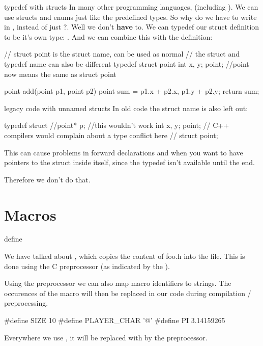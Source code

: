 \documentclass[10pt,graphics,aspectratio=169,table]{beamer}
\begin{document}
\begin{frame}[fragile]{typedef with structs}
    In many other programming languages,
    (including ).
    We can use structs and enums just like the predefined types.
    So why do we have to write  in , instead of just
     ?. Well we don't \textbf{have} to.
    We can typedef our struct definition to be it's own type:
    . And we can combine this with the definition:
    \begin{codeblock}
// struct point is the struct name, can be used as normal
// the struct and typedef name can also be different
typedef struct point{
    int x, y;
}point; //point now means the same as struct point

point add(point p1, point p2){
    point sum = {p1.x + p2.x, p1.y + p2.y};
    return sum;
}
    \end{codeblock}
\end{frame}
    \begin{frame}[fragile]{legacy code with unnamed structs}
    In old code the struct name is also left out:

    \begin{codeblock}
typedef struct{
    //point* p; //this wouldn't work
    int x, y;
}point;
// C++ compilers would complain about a type conflict here
// struct point;
    \end{codeblock}

    This can cause problems in forward declarations and when you
    want to have pointers to the struct
    inside itself, since the typedef isn't available until the end.

    Therefore we don't do that.
\end{frame}

\section{Macros}

\begin{frame}[fragile]{define}

We have talked about , which copies the content of
foo.h into the file.
This is done using the C preprocessor (as indicated by the \code{#}).

Using the preprocessor we can also map macro identifiers to strings.
The occurences of the macro will then be replaced in our code during
compilation / preprocessing.

\begin{codeblock}
#define SIZE 10
#define PLAYER_CHAR '@'
#define PI 3.14159265
\end{codeblock}

Everywhere we use , it will be replaced with  by the
preprocessor.
\end{frame}
\end{document}
